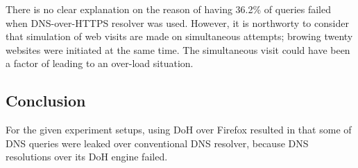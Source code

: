 There is no clear explanation on the reason of having 36.2\% of queries failed when DNS-over-HTTPS resolver was used.
However, it is northworty to consider that simulation of web visits are made on simultaneous attempts; browing twenty websites were initiated at the same time.
The simultaneous visit could have been a factor of leading to an over-load situation.

\subsection{Conclusion}
For the given experiment setups, using DoH over Firefox resulted in that some of DNS queries were leaked over conventional DNS resolver, because DNS resolutions over its DoH engine failed.